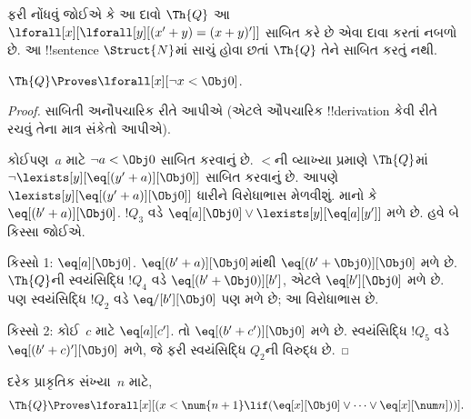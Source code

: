 \documentclass[../../../include/open-logic-section]{subfiles}
\begin{document}
ફરી નોંધવું જોઈએ કે આ દાવો
$\Th{Q}$ આ
$\lforall[x][\lforall[y][(x' + y) = (x + y)']]$
સાબિત કરે છે એવા દાવા કરતાં
નબળો છે. આ !!{sentence}
$\Struct{N}$માં સાચું હોવા છતાં
$\Th{Q}$ તેને સાબિત કરતું નથી.

\begin{lem}
$\Th{Q} \Proves \lforall[x][\lnot x < \Obj 0]$.
\end{lem}

\begin{proof}
સાબિતી અનૌપચારિક રીતે આપીએ
(એટલે ઔપચારિક !!{derivation}
કેવી રીતે રચવું તેના માત્ર સંકેતો
આપીએ).

કોઈપણ~$a$ માટે $\lnot a < \Obj 0$
સાબિત કરવાનું છે. $<$ની
વ્યાખ્યા પ્રમાણે $\Th{Q}$માં
$\lnot \lexists[y][\eq[(y'+a)][\Obj 0]]$
સાબિત કરવાનું છે. આપણે
$\lexists[y][\eq[(y'+a)][\Obj 0]]$
ધારીને વિરોધાભાસ મેળવીશું.
માનો કે $\eq[(b'+a)][\Obj 0]$.
$!Q_3$ વડે
$\eq[a][\Obj 0] \lor \lexists[y][\eq[a][y']]$
મળે છે. હવે બે કિસ્સા જોઈએ.

કિસ્સો 1: $\eq[a][\Obj 0]$.
$\eq[(b'+a)][\Obj 0]$માંથી
$\eq[(b' + \Obj 0)][\Obj 0]$
મળે છે. $\Th{Q}$ની સ્વયંસિદ્ધિ
$!Q_4$ વડે
$\eq[(b' + \Obj 0)][b']$,
એટલે $\eq[b'][\Obj 0]$ મળે છે.
પણ સ્વયંસિદ્ધિ $!Q_2$ વડે
$\eq/[b'][\Obj 0]$ પણ મળે છે;
આ વિરોધાભાસ છે.

કિસ્સો 2: કોઈ~$c$ માટે
$\eq[a][c']$. તો
$\eq[(b' + c')][\Obj 0]$ મળે છે.
સ્વયંસિદ્ધિ $!Q_5$ વડે
$\eq[(b' + c)'][\Obj 0]$ મળે,
જે ફરી સ્વયંસિદ્ધિ $Q_2$ની
વિરુદ્ધ છે.
\end{proof}

\begin{lem}
દરેક પ્રાકૃતિક સંખ્યા~$n$ માટે,
  \[
  \Th{Q} \Proves
  \lforall[x][(x < \num {n+1} \lif (\eq[x][\Obj 0] \lor \dots \lor
    \eq[x][\num n]))].
  \]
\end{lem}
\end{document}
